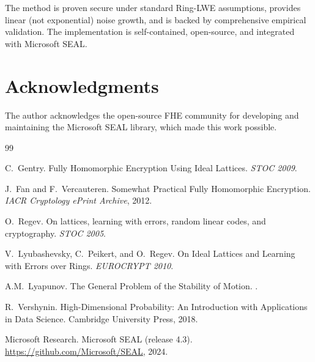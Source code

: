 \documentclass[11pt,a4paper]{article}
\begin{document}
The method is proven secure under standard Ring-LWE assumptions, provides linear (not exponential) noise growth, and is backed by comprehensive empirical validation. The implementation is self-contained, open-source, and integrated with Microsoft SEAL.

\section*{Acknowledgments}

The author acknowledges the open-source FHE community for developing and maintaining the Microsoft SEAL library, which made this work possible.

\begin{thebibliography}{99}

C.~Gentry.
\newblock Fully Homomorphic Encryption Using Ideal Lattices.
\newblock \emph{STOC 2009}.

J.~Fan and F.~Vercauteren.
\newblock Somewhat Practical Fully Homomorphic Encryption.
\newblock \emph{IACR Cryptology ePrint Archive}, 2012.

O.~Regev.
\newblock On lattices, learning with errors, random linear codes, and cryptography.
\newblock \emph{STOC 2005}.

V.~Lyubashevsky, C.~Peikert, and O.~Regev.
\newblock On Ideal Lattices and Learning with Errors over Rings.
\newblock \emph{EUROCRYPT 2010}.

A.M.~Lyapunov.
\newblock The General Problem of the Stability of Motion.
.

R.~Vershynin.
\newblock High-Dimensional Probability: An Introduction with Applications in Data Science.
\newblock Cambridge University Press, 2018.

Microsoft Research.
\newblock Microsoft SEAL (release 4.3).
\newblock \url{https://github.com/Microsoft/SEAL}, 2024.

\end{thebibliography}
\end{document}
